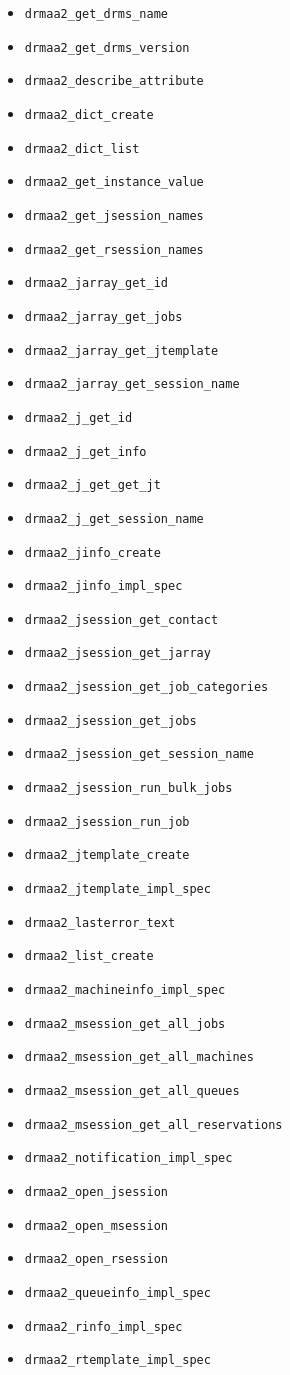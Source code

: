 \documentclass{article}
\newcommand{\h}[1]{\texttt{#1}}
\begin{document}
\begin{itemize}
	\item \h{drmaa2\_get\_drms\_name}
	\item \h{drmaa2\_get\_drms\_version}
	\item \h{drmaa2\_describe\_attribute }
	\item \h{drmaa2\_dict\_create}
	\item \h{drmaa2\_dict\_list }
	\item \h{drmaa2\_get\_instance\_value}
	\item \h{drmaa2\_get\_jsession\_names}
	\item \h{drmaa2\_get\_rsession\_names}
	\item \h{drmaa2\_jarray\_get\_id}
	\item \h{drmaa2\_jarray\_get\_jobs}
	\item \h{drmaa2\_jarray\_get\_jtemplate}
	\item \h{drmaa2\_jarray\_get\_session\_name}
	\item \h{drmaa2\_j\_get\_id}
	\item \h{drmaa2\_j\_get\_info}
	\item \h{drmaa2\_j\_get\_get\_jt}
	\item \h{drmaa2\_j\_get\_session\_name}
	\item \h{drmaa2\_jinfo\_create}
	\item \h{drmaa2\_jinfo\_impl\_spec}
	\item \h{drmaa2\_jsession\_get\_contact}
	\item \h{drmaa2\_jsession\_get\_jarray}
	\item \h{drmaa2\_jsession\_get\_job\_categories}
	\item \h{drmaa2\_jsession\_get\_jobs}
	\item \h{drmaa2\_jsession\_get\_session\_name}
	\item \h{drmaa2\_jsession\_run\_bulk\_jobs}
	\item \h{drmaa2\_jsession\_run\_job}
	\item \h{drmaa2\_jtemplate\_create}
	\item \h{drmaa2\_jtemplate\_impl\_spec}
	\item \h{drmaa2\_lasterror\_text}
	\item \h{drmaa2\_list\_create}
	\item \h{drmaa2\_machineinfo\_impl\_spec}
	\item \h{drmaa2\_msession\_get\_all\_jobs}
	\item \h{drmaa2\_msession\_get\_all\_machines}
	\item \h{drmaa2\_msession\_get\_all\_queues}
	\item \h{drmaa2\_msession\_get\_all\_reservations}
	\item \h{drmaa2\_notification\_impl\_spec}
	\item \h{drmaa2\_open\_jsession}
	\item \h{drmaa2\_open\_msession}
	\item \h{drmaa2\_open\_rsession}
	\item \h{drmaa2\_queueinfo\_impl\_spec}
	\item \h{drmaa2\_rinfo\_impl\_spec}
	\item \h{drmaa2\_rtemplate\_impl\_spec}
\end{itemize}
\end{document}
